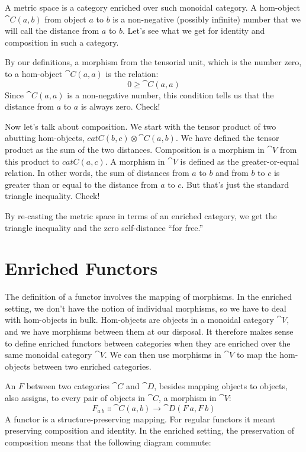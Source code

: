 A metric space is a category enriched over such monoidal category. A
hom-object $\cat{C}(a, b)$ from object $a$ to $b$ is a
non-negative (possibly infinite) number that we will call the distance
from $a$ to $b$. Let's see what we get for identity and
composition in such a category.

By our definitions, a morphism from the tensorial unit, which is the
number zero, to a hom-object $\cat{C}(a, a)$ is the relation:
\[0 \geqslant \cat{C}(a, a)\]
Since $\cat{C}(a, a)$ is a non-negative number, this condition tells
us that the distance from $a$ to $a$ is always zero.
Check!

Now let's talk about composition. We start with the tensor product of
two abutting hom-objects, $cat{C}(b, c) \otimes \cat{C}(a, b)$. We have defined
the tensor product as the sum of the two distances. Composition is a
morphism in $\cat{V}$ from this product to $cat{C}(a, c)$. A morphism
in $\cat{V}$ is defined as the greater-or-equal relation. In other words,
the sum of distances from $a$ to $b$ and from $b$
to $c$ is greater than or equal to the distance from $a$
to $c$. But that's just the standard triangle inequality. Check!

By re-casting the metric space in terms of an enriched category, we get
the triangle inequality and the zero self-distance ``for free.''

\section{Enriched Functors}

The definition of a functor involves the mapping of morphisms. In the
enriched setting, we don't have the notion of individual morphisms, so
we have to deal with hom-objects in bulk. Hom-objects are objects in a
monoidal category $\cat{V}$, and we have morphisms between them at our
disposal. It therefore makes sense to define enriched functors between
categories when they are enriched over the same monoidal category
$\cat{V}$. We can then use morphisms in $\cat{V}$ to map the hom-objects
between two enriched categories.

An  $F$ between two categories $\cat{C}$
and $\cat{D}$, besides mapping objects to objects, also assigns, to every
pair of objects in $\cat{C}$, a morphism in $\cat{V}$:
\[F_{a\ b} \Colon \cat{C}(a, b) \to \cat{D}(F\ a, F\ b)\]
A functor is a structure-preserving mapping. For regular functors it
meant preserving composition and identity. In the enriched setting, the
preservation of composition means that the following diagram commute:

